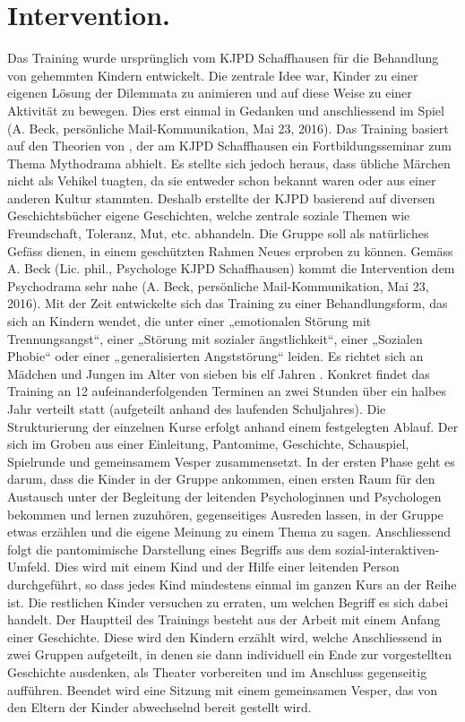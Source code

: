 \section{Intervention.} Das Training wurde ursprünglich vom KJPD Schaffhausen für die Behandlung von gehemmten Kindern entwickelt. Die zentrale Idee war, Kinder zu einer eigenen Lösung der Dilemmata zu animieren und auf diese Weise zu einer Aktivität zu bewegen. Dies erst einmal in Gedanken und anschliessend im Spiel (A. Beck, persönliche Mail-Kommunikation, Mai 23, 2016). Das Training basiert auf den Theorien von , der am KJPD Schaffhausen ein Fortbildungsseminar zum Thema Mythodrama abhielt. Es stellte sich jedoch heraus, dass übliche Märchen nicht als Vehikel tuagten, da sie entweder schon bekannt waren oder aus einer anderen Kultur stammten. Deshalb erstellte der KJPD basierend auf diversen Geschichtsbücher eigene Geschichten, welche zentrale soziale Themen wie Freundschaft, Toleranz, Mut, etc. abhandeln. Die Gruppe soll als natürliches Gefäss dienen, in einem geschützten Rahmen Neues erproben zu können. Gemäss A. Beck (Lic. phil., Psychologe KJPD Schaffhausen) kommt die Intervention dem Psychodrama \cite{Moreno:2008} sehr nahe (A. Beck, persönliche Mail-Kommunikation, Mai 23, 2016). Mit der Zeit entwickelte sich das Training zu einer Behandlungsform, das sich an Kindern wendet, die unter einer „emotionalen Störung mit Trennungsangst“, einer „Störung mit sozialer ängstlichkeit“, einer „Sozialen Phobie“ oder einer „generalisierten Angststörung“ leiden. Es richtet sich an Mädchen und Jungen im Alter von sieben bis elf Jahren \cite{KJPD:2016}. Konkret findet das Training an 12 aufeinanderfolgenden Terminen an zwei Stunden über ein halbes Jahr verteilt statt (aufgeteilt anhand des laufenden Schuljahres). Die Strukturierung der einzelnen Kurse erfolgt anhand einem festgelegten Ablauf. Der sich im Groben aus einer Einleitung, Pantomime, Geschichte, Schauspiel, Spielrunde und gemeinsamem Vesper zusammensetzt. In der ersten Phase geht es darum, dass die Kinder in der Gruppe ankommen, einen ersten Raum für den Austausch unter der Begleitung der leitenden Psychologinnen und Psychologen bekommen und lernen zuzuhören, gegenseitiges Ausreden lassen, in der Gruppe etwas erzählen und die eigene Meinung zu einem Thema zu sagen. Anschliessend folgt die pantomimische Darstellung eines Begriffs aus dem sozial-interaktiven-Umfeld. Dies wird mit einem Kind und der Hilfe einer leitenden Person durchgeführt, so dass jedes Kind mindestens einmal im ganzen Kurs an der Reihe ist. Die restlichen Kinder versuchen zu erraten, um welchen Begriff es sich dabei handelt. Der Hauptteil des Trainings besteht aus der Arbeit mit einem Anfang einer Geschichte. Diese wird den Kindern erzählt wird, welche Anschliessend in zwei Gruppen aufgeteilt, in denen sie dann individuell ein Ende zur vorgestellten Geschichte ausdenken, als Theater vorbereiten und im Anschluss gegenseitig aufführen. Beendet wird eine Sitzung mit einem gemeinsamen Vesper, das von den Eltern der Kinder abwechselnd bereit gestellt wird. 

